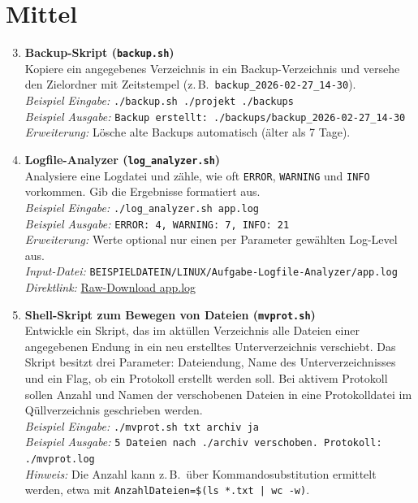 \documentclass[11pt, oneside, numbers=nönddot]{scrbook}
\begin{document}
\section{Mittel}
\begin{enumerate}
\setcounter{enumi}{2}
\item \textbf{Backup-Skript (\texttt{backup.sh})}\\
Kopiere ein angegebenes Verzeichnis in ein Backup-Verzeichnis und versehe den Zielordner mit Zeitstempel (z.\,B.\ \texttt{backup\_2026-02-27\_14-30}).\\
\textit{Beispiel Eingabe:} \texttt{./backup.sh ./projekt ./backups}\\
\textit{Beispiel Ausgabe:} \texttt{Backup erstellt: ./backups/backup\_2026-02-27\_14-30}\\
\textit{Erweiterung:} Lösche alte Backups automatisch (älter als 7 Tage).

\item \textbf{Logfile-Analyzer (\texttt{log\_analyzer.sh})}\\
Analysiere eine Logdatei und zähle, wie oft \texttt{ERROR}, \texttt{WARNING} und \texttt{INFO} vorkommen. Gib die Ergebnisse formatiert aus.\\
\textit{Beispiel Eingabe:} \texttt{./log\_analyzer.sh app.log}\\
\textit{Beispiel Ausgabe:} \texttt{ERROR: 4, WARNING: 7, INFO: 21}\\
\textit{Erweiterung:} Werte optional nur einen per Parameter gewählten Log-Level aus.\\
\textit{Input-Datei:} \texttt{BEISPIELDATEIN/LINUX/Aufgabe-Logfile-Analyzer/app.log}\\
\textit{Direktlink:} \href{https://raw.githubusercontent.com/michelroegl-brunner/HTL-Braunau/main/BEISPIELDATEIN/LINUX/Aufgabe-Logfile-Analyzer/app.log}{Raw-Download app.log}

\item \textbf{Shell-Skript zum Bewegen von Dateien (\texttt{mvprot.sh})}\\
Entwickle ein Skript, das im aktüllen Verzeichnis alle Dateien einer angegebenen Endung in ein neu erstelltes Unterverzeichnis verschiebt. Das Skript besitzt drei Parameter: Dateiendung, Name des Unterverzeichnisses und ein Flag, ob ein Protokoll erstellt werden soll. Bei aktivem Protokoll sollen Anzahl und Namen der verschobenen Dateien in eine Protokolldatei im Qüllverzeichnis geschrieben werden.\\
\textit{Beispiel Eingabe:} \texttt{./mvprot.sh txt archiv ja}\\
\textit{Beispiel Ausgabe:} \texttt{5 Dateien nach ./archiv verschoben. Protokoll: ./mvprot.log}\\
\textit{Hinweis:} Die Anzahl kann z.\,B.\ über Kommandosubstitution ermittelt werden, etwa mit \texttt{AnzahlDateien=\$(ls *.txt | wc -w)}.
\end{enumerate}
\end{document}
